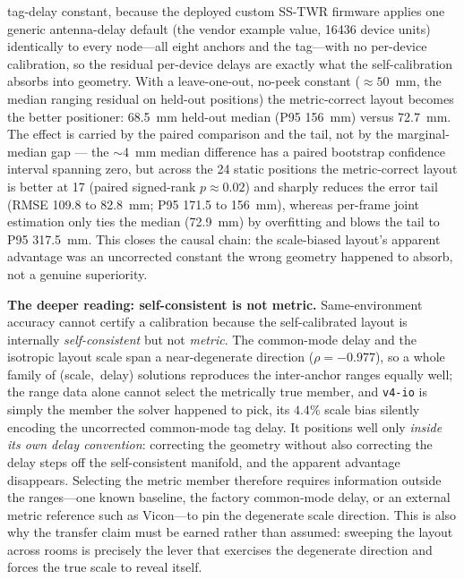 \documentclass[11pt,a4paper]{article}
\begin{document}
tag-delay constant, because the deployed custom SS-TWR firmware applies one generic
antenna-delay default (the vendor example value, 16436 device units) identically to every
node---all eight anchors and the tag---with no per-device calibration, so the residual
per-device delays are exactly what the self-calibration absorbs into geometry. With a
leave-one-out, no-peek constant ($\approx 50$~mm, the median ranging residual on held-out
positions) the metric-correct layout becomes the better positioner: 68.5~mm held-out
median (P95 156~mm) versus 72.7~mm. The effect is carried by the paired comparison and the tail,
not by the marginal-median gap --- the $\sim$4~mm median difference has a paired bootstrap confidence
interval spanning zero, but across the 24 static positions the metric-correct layout is better at 17
(paired signed-rank $p\approx0.02$) and sharply reduces the error tail (RMSE 109.8 to 82.8~mm; P95
171.5 to 156~mm), whereas per-frame joint estimation only ties the median (72.9~mm) by overfitting and
blows the tail to P95 317.5~mm. This closes the causal chain: the scale-biased layout's apparent advantage
was an uncorrected constant the wrong geometry happened to absorb, not a genuine
superiority.

\textbf{The deeper reading: self-consistent is not metric.} Same-environment
accuracy cannot certify a calibration because the self-calibrated layout is internally
\emph{self-consistent} but not \emph{metric}. The common-mode delay and the isotropic
layout scale span a near-degenerate direction ($\rho=-0.977$), so a whole family of
(scale,~delay) solutions reproduces the inter-anchor ranges equally well; the range data
alone cannot select the metrically true member, and \texttt{v4-io} is simply the member
the solver happened to pick, its $4.4\%$ scale bias silently encoding the uncorrected
common-mode tag delay. It positions well only \emph{inside its own delay convention}:
correcting the geometry without also correcting the delay steps off the self-consistent
manifold, and the apparent advantage disappears. Selecting the metric member therefore
requires information outside the ranges---one known baseline, the factory common-mode
delay, or an external metric reference such as Vicon---to pin the degenerate scale
direction. This is also why the transfer claim must be earned rather than assumed:
sweeping the layout across rooms is precisely the lever that exercises the degenerate
direction and forces the true scale to reveal itself.
\end{document}
